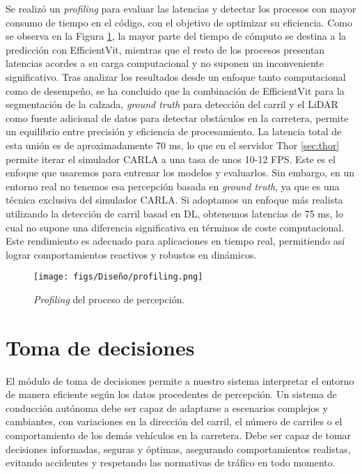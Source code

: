 Se realizó un \textit{profiling} para evaluar las latencias y detectar los procesos con mayor consumo de tiempo en el código, con el objetivo de optimizar su eficiencia. Como se observa en la Figura \ref{fig:profiling}, la mayor parte del tiempo de cómputo se destina a la predicción con EfficientVit, mientras que el resto de los procesos presentan latencias acordes a su carga computacional y no suponen un inconveniente significativo. Tras analizar los resultados desde un enfoque tanto computacional como de desempeño, se ha concluido que la combinación de EfficientVit para la segmentación de la calzada, \textit{ground truth} para detección del carril y el \ac{LiDAR} como fuente adicional de datos para detectar obstáculos en la carretera, permite un equilibrio entre precisión y eficiencia de procesamiento. La latencia total de esta unión es de aproximadamente 70 ms, lo que en el servidor Thor \ref{sec:thor} permite iterar el simulador CARLA a una tasa de unos 10-12 \ac{FPS}. Este es el enfoque que usaremos para entrenar los modelos y evaluarlos. Sin embargo, en un entorno real no tenemos esa percepción basada en \textit{ground truth}, ya que es una técnica exclusiva del simulador CARLA. Si adoptamos un enfoque más realista utilizando la detección de carril basad en \ac{DL}, obtenemos latencias de 75 ms, lo cual no supone una diferencia significativa en términos de coste computacional. Este rendimiento es adecuado para aplicaciones en tiempo real, permitiendo así lograr comportamientos reactivos y robustos en dinámicos.
\begin{figure}[ht]
  \centering
  \texttt{[image: figs/Diseño/profiling.png]}
  \caption{\textit{Profiling} del proceso de percepción.}
  \label{fig:profiling}
\end{figure}

\section{Toma de decisiones}

El módulo de toma de decisiones permite a nuestro sistema interpretar el entorno de manera eficiente según los datos procedentes de percepción. Un sistema de conducción autónoma debe ser capaz de adaptarse a escenarios complejos y cambiantes, con variaciones en la dirección del carril, el número de carriles o el comportamiento de los demás vehículos en la carretera. Debe ser capaz de tomar decisiones informadas, seguras y óptimas, asegurando comportamientos realistas, evitando accidentes y respetando las normativas de tráfico en todo momento.

